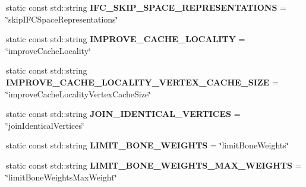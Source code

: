 \begin{DoxyCompactItemize}
\item 
\hypertarget{classrepo_1_1manipulator_1_1modelconvertor_1_1_model_import_config_a0b78b393e90c4867aecab0dfcd88d3cf}{}static const std\+::string {\bfseries I\+F\+C\+\_\+\+S\+K\+I\+P\+\_\+\+S\+P\+A\+C\+E\+\_\+\+R\+E\+P\+R\+E\+S\+E\+N\+T\+A\+T\+I\+O\+N\+S} = \char`\"{}skip\+I\+F\+C\+Space\+Representations\char`\"{}\label{classrepo_1_1manipulator_1_1modelconvertor_1_1_model_import_config_a0b78b393e90c4867aecab0dfcd88d3cf}

\item 
\hypertarget{classrepo_1_1manipulator_1_1modelconvertor_1_1_model_import_config_ade39d8c7feb9dfa9c976673ba357e8e2}{}static const std\+::string {\bfseries I\+M\+P\+R\+O\+V\+E\+\_\+\+C\+A\+C\+H\+E\+\_\+\+L\+O\+C\+A\+L\+I\+T\+Y} = \char`\"{}improve\+Cache\+Locality\char`\"{}\label{classrepo_1_1manipulator_1_1modelconvertor_1_1_model_import_config_ade39d8c7feb9dfa9c976673ba357e8e2}

\item 
\hypertarget{classrepo_1_1manipulator_1_1modelconvertor_1_1_model_import_config_a69ab02c4c06040101af573dbd7d691a5}{}static const std\+::string {\bfseries I\+M\+P\+R\+O\+V\+E\+\_\+\+C\+A\+C\+H\+E\+\_\+\+L\+O\+C\+A\+L\+I\+T\+Y\+\_\+\+V\+E\+R\+T\+E\+X\+\_\+\+C\+A\+C\+H\+E\+\_\+\+S\+I\+Z\+E} = \char`\"{}improve\+Cache\+Locality\+Vertex\+Cache\+Size\char`\"{}\label{classrepo_1_1manipulator_1_1modelconvertor_1_1_model_import_config_a69ab02c4c06040101af573dbd7d691a5}

\item 
\hypertarget{classrepo_1_1manipulator_1_1modelconvertor_1_1_model_import_config_a3114a2dfb3903d96490adb1309237445}{}static const std\+::string {\bfseries J\+O\+I\+N\+\_\+\+I\+D\+E\+N\+T\+I\+C\+A\+L\+\_\+\+V\+E\+R\+T\+I\+C\+E\+S} = \char`\"{}join\+Identical\+Vertices\char`\"{}\label{classrepo_1_1manipulator_1_1modelconvertor_1_1_model_import_config_a3114a2dfb3903d96490adb1309237445}

\item 
\hypertarget{classrepo_1_1manipulator_1_1modelconvertor_1_1_model_import_config_a6c4a93a78c559fa12112f0db0f05e0c8}{}static const std\+::string {\bfseries L\+I\+M\+I\+T\+\_\+\+B\+O\+N\+E\+\_\+\+W\+E\+I\+G\+H\+T\+S} = \char`\"{}limit\+Bone\+Weights\char`\"{}\label{classrepo_1_1manipulator_1_1modelconvertor_1_1_model_import_config_a6c4a93a78c559fa12112f0db0f05e0c8}

\item 
\hypertarget{classrepo_1_1manipulator_1_1modelconvertor_1_1_model_import_config_a1adf345e9ebe53d52b9cb9972febf6f5}{}static const std\+::string {\bfseries L\+I\+M\+I\+T\+\_\+\+B\+O\+N\+E\+\_\+\+W\+E\+I\+G\+H\+T\+S\+\_\+\+M\+A\+X\+\_\+\+W\+E\+I\+G\+H\+T\+S} = \char`\"{}limit\+Bone\+Weights\+Max\+Weight\char`\"{}\label{classrepo_1_1manipulator_1_1modelconvertor_1_1_model_import_config_a1adf345e9ebe53d52b9cb9972febf6f5}


\end{DoxyCompactItemize}
